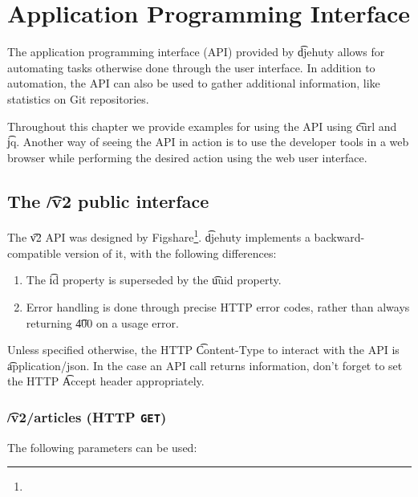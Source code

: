 \chapter{Application Programming Interface}

  The application programming interface (API) provided by \t{djehuty} allows
  for automating tasks otherwise done through the user interface.  In addition
  to automation, the API can also be used to gather additional information,
  like statistics on Git repositories.

  Throughout this chapter we provide examples for using the API using \t{curl} and \t{jq}.
  Another way of seeing the API in action is to use the developer tools in a web
  browser while performing the desired action using the web user interface.

\section{The \t{/v2} public interface}

  The \t{v2} API was designed by Figshare\footnote{}.
  \t{djehuty} implements a backward-compatible version of it, with the
  following differences:
  \begin{enumerate}
    \item{The \t{id} property is superseded by the \t{uuid} property.}
    \item{Error handling is done through precise HTTP error codes,
        rather than always returning \t{400} on a usage error.}
  \end{enumerate}

  Unless specified otherwise, the HTTP \t{Content-Type} to interact
  with the API is \t{application/json}.  In the case an API call returns
  information, don't forget to set the HTTP \t{Accept} header appropriately.

\subsection{\t{/v2/articles} (HTTP \texttt{GET})}
\label{sec:v2-articles}

  The following parameters can be used:

